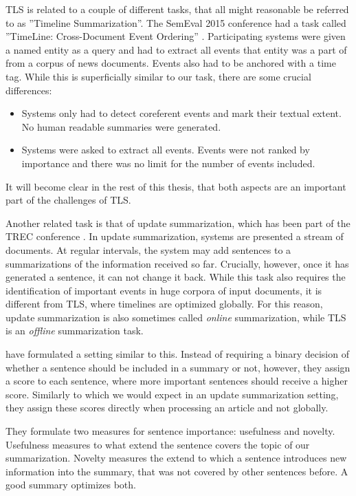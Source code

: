 \documentclass[a4paper,BCOR=10mm]{report}
\numberwithin{lemma}{chapter}
\numberwithin{definition}{chapter}
\begin{document}

TLS is related to a couple of different tasks, that all might reasonable be referred to as ''Timeline Summarization''.
The SemEval 2015 conference had a task called ''TimeLine: Cross-Document Event Ordering'' \citep{semeval-timeline}. Participating systems were given a named entity as a query and had to extract all events that entity was a part of from a corpus of news documents. Events also had to be anchored with a time tag.
While this is superficially similar to our task, there are some crucial differences:

\begin{itemize}
    \item{Systems only had to detect coreferent events and mark their textual extent. No human readable summaries were generated. }
    \item{Systems were asked to extract all events. Events were not ranked by importance and there was no limit for the number of events included. }
\end{itemize}

It will become clear in the rest of this thesis, that both aspects are an important part of the challenges of TLS.

Another related task is that of update summarization, which has been part of the TREC conference \citep{trec-update}.
In update summarization, systems are presented a stream of documents.
At regular intervals, the system may add sentences to a summarizations of the information received so far.
Crucially, however, once it has generated a sentence, it can not change it back.
While this task also requires the identification of important events in huge corpora of input documents, it is different from TLS, where timelines are optimized globally. For this reason, update summarization is also sometimes called \textit{online} summarization, while TLS is an \textit{offline} summarization task.

\citet{swan+allen-temporal-summaries} have formulated a setting similar to this. Instead of requiring a binary decision of whether a sentence should be included in a summary or not, however, they assign a score to each sentence, where more important sentences should receive a higher score. Similarly to which we would expect in an update summarization setting, they assign these scores directly when processing an article and not globally.

They formulate two measures for sentence importance: usefulness and novelty.
Usefulness measures to what extend the sentence covers the topic of our summarization. Novelty measures the extend to which a sentence introduces new information into the summary, that was not covered by other sentences before.
A good summary optimizes both.
\end{document}
